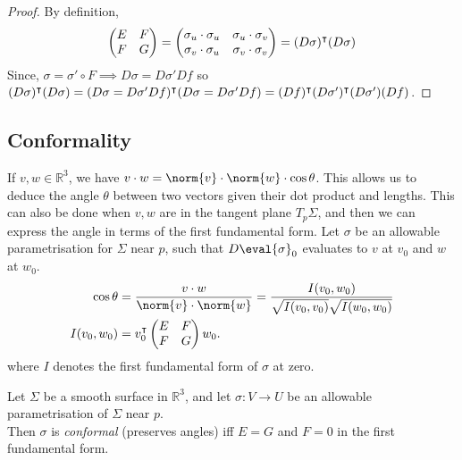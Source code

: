\begin{proof}
	By definition,
	\begin{align*}
		\begin{pmatrix}
			E & F \\
			F & G
		\end{pmatrix} = \begin{pmatrix}
			\sigma_u \cdot \sigma_u & \sigma_u \cdot \sigma_v \\
			\sigma_v \cdot \sigma_u & \sigma_v \cdot \sigma_v
		\end{pmatrix} = (D\sigma)^\intercal (D\sigma)
	\end{align*}
	Since, $\sigma = \sigma' \circ F \implies D \sigma = D \sigma' Df$ so $(D\sigma)^\intercal (D\sigma) = (D \sigma = D \sigma' Df)^\intercal (D \sigma = D \sigma' Df) = (Df)^\intercal (D\sigma')^\intercal (D\sigma') (Df)$.
\end{proof}

\subsection{Conformality}
If $v,w \in \mathbb R^3$, we have $v \cdot w = \norm{v} \cdot \norm{w} \cdot \cos\theta$.
This allows us to deduce the angle $\theta$ between two vectors given their dot product and lengths.
This can also be done when $v,w$ are in the tangent plane $T_p \Sigma$, and then we can express the angle in terms of the first fundamental form.
Let $\sigma$ be an allowable parametrisation for $\Sigma$ near $p$, such that $D\eval{\sigma}_0$ evaluates to $v$ at $v_0$ and $w$ at $w_0$.
\begin{align*}
	\cos \theta &= \frac{v \cdot w}{\norm{v} \cdot \norm{w}} = \frac{I(v_0, w_0)}{\sqrt{I(v_0,v_0)} \sqrt{I(w_0,w_0)}} \\
	I(v_0, w_0) &= v_0^\tran \begin{pmatrix}
		E & F \\
		F & G
	\end{pmatrix} w_0.
\end{align*}
where $I$ denotes the first fundamental form of $\sigma$ at zero.

\begin{lemma}
	Let $\Sigma$ be a smooth surface in $\mathbb R^3$, and let $\sigma \colon V \to U$ be an allowable parametrisation of $\Sigma$ near $p$. \\
	Then $\sigma$ is \textit{conformal} (preserves angles) iff $E = G$ and $F = 0$ in the first fundamental form.
\end{lemma}

